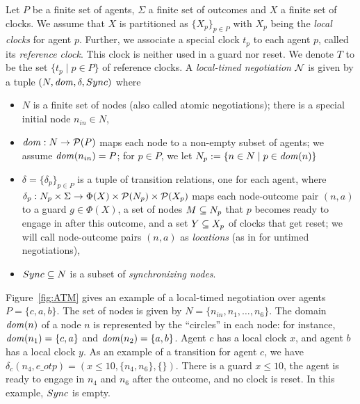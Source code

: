\begin{definition}\label{def:local-timed-negot}
Let $P$ be a finite set of agents, $\Sigma$ a finite set of outcomes and $X$ a finite set of clocks. We assume that $X$ is partitioned as $\{ X_p \}_{p \in P}$ with $X_p$ being the \emph{local clocks} for agent $p$. Further, we associate a special clock $t_p$ to each agent $p$, called its \emph{reference clock}. This clock is neither used in a guard nor reset. We denote $T$ to be the set $\{ t_p \mid p \in P \}$ of reference clocks. A \emph{local-timed negotiation} $\mathcal{N}$ is given by a tuple $(N, \mathit{dom}, \delta, Sync)$ where
\begin{itemize}
	\item $N$ is a finite set of nodes (also called atomic negotiations); there is a special initial node $n_{in} \in N$,
	\item $\mathit{dom}: N \to \mathcal{P}(P)$ maps each node to a non-empty subset of agents; we assume $\mathit{dom}(n_{in}) = P$; for $p \in P$, we let $N_p := \{ n \in N \mid p \in \mathit{dom}(n) \}$
	\item $\delta = \{\delta_p\}_{p \in P}$ is a tuple of transition relations, one for each agent, where $\delta_p: N_p \times \Sigma \to \Phi(X) \times \mathcal{P}(N_p) \times \mathcal{P}(X_p)$ maps each node-outcome pair $(n, a)$ to a guard $g \in \Phi(X)$, a set of nodes $M \subseteq N_p$ that $p$ becomes ready to engage in after this outcome, and a set $Y \subseteq X_p$ of clocks that get reset; we will call node-outcome pairs $(n, a)$ as \emph{locations} (as in \cite{DBLP:conf/lics/EsparzaMW17} for untimed negotiations), 
	\item $Sync \subseteq N$ is a subset of \emph{synchronizing nodes}.
\end{itemize}
\end{definition}

Figure~\ref{fig:ATM} gives an example of a local-timed negotiation over agents $P = \{c, a, b\}$. The set of nodes is given by $N = \{n_{in}, n_1, \dots, n_6\}$.  The domain $\mathit{dom}(n)$ of a node $n$ is represented by the ``circles'' in each node: for instance, $\mathit{dom}(n_1) = \{c, a\}$ and $\mathit{dom}(n_2) = \{a, b\}$. Agent $c$ has a local clock $x$, and agent $b$ has a local clock $y$. As an example of a transition for agent $c$, we have $\delta_c(n_4, e\_otp) = (x \le 10, \{n_4, n_6\}, \{\})$. There is a guard $x \le 10$, the agent is ready to engage in $n_4$ and $n_6$ after the outcome, and no clock is reset. In this example, $Sync$ is empty. 

